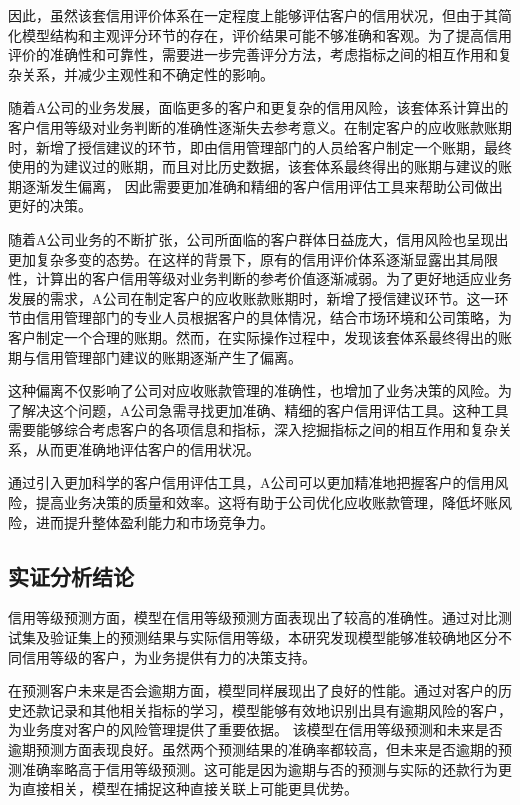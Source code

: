 因此，虽然该套信用评价体系在一定程度上能够评估客户的信用状况，但由于其简化模型结构和主观评分环节的存在，评价结果可能不够准确和客观。为了提高信用评价的准确性和可靠性，需要进一步完善评分方法，考虑指标之间的相互作用和复杂关系，并减少主观性和不确定性的影响。

随着A公司的业务发展，面临更多的客户和更复杂的信用风险，该套体系计算出的客户信用等级对业务判断的准确性逐渐失去参考意义。在制定客户的应收账款账期时，新增了授信建议的环节，即由信用管理部门的人员给客户制定一个账期，最终使用的为建议过的账期，而且对比历史数据，该套体系最终得出的账期与建议的账期逐渐发生偏离，
因此需要更加准确和精细的客户信用评估工具来帮助公司做出更好的决策。

随着A公司业务的不断扩张，公司所面临的客户群体日益庞大，信用风险也呈现出更加复杂多变的态势。在这样的背景下，原有的信用评价体系逐渐显露出其局限性，计算出的客户信用等级对业务判断的参考价值逐渐减弱。为了更好地适应业务发展的需求，A公司在制定客户的应收账款账期时，新增了授信建议环节。这一环节由信用管理部门的专业人员根据客户的具体情况，结合市场环境和公司策略，为客户制定一个合理的账期。然而，在实际操作过程中，发现该套体系最终得出的账期与信用管理部门建议的账期逐渐产生了偏离。

这种偏离不仅影响了公司对应收账款管理的准确性，也增加了业务决策的风险。为了解决这个问题，A公司急需寻找更加准确、精细的客户信用评估工具。这种工具需要能够综合考虑客户的各项信息和指标，深入挖掘指标之间的相互作用和复杂关系，从而更准确地评估客户的信用状况。

通过引入更加科学的客户信用评估工具，A公司可以更加精准地把握客户的信用风险，提高业务决策的质量和效率。这将有助于公司优化应收账款管理，降低坏账风险，进而提升整体盈利能力和市场竞争力。

\fi

\subsection{实证分析结论}

 信用等级预测方面，模型在信用等级预测方面表现出了较高的准确性。通过对比测试集及验证集上的预测结果与实际信用等级，本研究发现模型能够准较确地区分不同信用等级的客户，为业务提供有力的决策支持。
 
 在预测客户未来是否会逾期方面，模型同样展现出了良好的性能。通过对客户的历史还款记录和其他相关指标的学习，模型能够有效地识别出具有逾期风险的客户，为业务度对客户的风险管理提供了重要依据。
  该模型在信用等级预测和未来是否逾期预测方面表现良好。虽然两个预测结果的准确率都较高，但未来是否逾期的预测准确率略高于信用等级预测。这可能是因为逾期与否的预测与实际的还款行为更为直接相关，模型在捕捉这种直接关联上可能更具优势。
 
